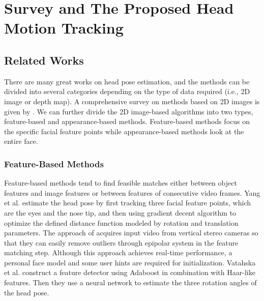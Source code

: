 \chapter{Survey and The Proposed Head Motion Tracking}
\label{c:related}

\section{Related Works}
There are many great works on head pose estimation, and the methods can be divided into several categories depending on the type of data required (i.e., 2D image or depth map). A comprehensive survey on methods based on 2D images is given by \cite{Ref_Survey}. We can further divide the 2D image-based algorithms into two types, feature-based \cite{Ref1,Ref8,Ref10,Ref11,Ref18} and appearance-based \cite{Ref2,Ref4,Ref5,Ref6,Ref7,Ref17,Ref18} methods. Feature-based methods focus on the specific facial feature points while appearance-based methods look at the entire face.
\cite{1004163,1240823}

\subsection{Feature-Based Methods}
Feature-based methods tend to find feasible matches either between object features and image features or between features of consecutive video frames. Yang et al. \cite{patent} estimate the head pose by first tracking three facial feature points, which are the eyes and the nose tip, and then using gradient decent algorithm to optimize the defined distance function modeled by rotation and translation parameters. The approach of \cite{Ref1} acquires input video from vertical stereo cameras so that they can easily remove outliers through epipolar system in the feature matching step. Although this approach achieves real-time performance, a personal face model and some user hints are required for initialization. Vatahska et al. \cite{Ref8} construct a feature detector using Adaboost in combination with Haar-like features. Then they use a neural network to estimate the three rotation angles of the head pose.

